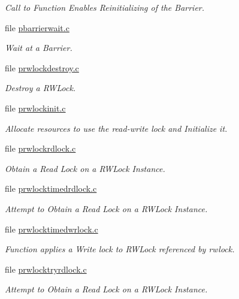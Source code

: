 \begin{DoxyCompactItemize}
\begin{DoxyCompactList}\small\item\em Call to Function Enables Reinitializing of the Barrier. \end{DoxyCompactList}\item 
file \mbox{\hyperlink{pbarrierwait_8c}{pbarrierwait.\+c}}
\begin{DoxyCompactList}\small\item\em Wait at a Barrier. \end{DoxyCompactList}\item 
file \mbox{\hyperlink{prwlockdestroy_8c}{prwlockdestroy.\+c}}
\begin{DoxyCompactList}\small\item\em Destroy a R\+W\+Lock. \end{DoxyCompactList}\item 
file \mbox{\hyperlink{prwlockinit_8c}{prwlockinit.\+c}}
\begin{DoxyCompactList}\small\item\em Allocate resources to use the read-\/write lock and Initialize it. \end{DoxyCompactList}\item 
file \mbox{\hyperlink{prwlockrdlock_8c}{prwlockrdlock.\+c}}
\begin{DoxyCompactList}\small\item\em Obtain a Read Lock on a R\+W\+Lock Instance. \end{DoxyCompactList}\item 
file \mbox{\hyperlink{prwlocktimedrdlock_8c}{prwlocktimedrdlock.\+c}}
\begin{DoxyCompactList}\small\item\em Attempt to Obtain a Read Lock on a R\+W\+Lock Instance. \end{DoxyCompactList}\item 
file \mbox{\hyperlink{prwlocktimedwrlock_8c}{prwlocktimedwrlock.\+c}}
\begin{DoxyCompactList}\small\item\em Function applies a Write lock to R\+W\+Lock referenced by rwlock. \end{DoxyCompactList}\item 
file \mbox{\hyperlink{prwlocktryrdlock_8c}{prwlocktryrdlock.\+c}}
\begin{DoxyCompactList}\small\item\em Attempt to Obtain a Read Lock on a R\+W\+Lock Instance. \end{DoxyCompactList}\item 

\end{DoxyCompactItemize}
